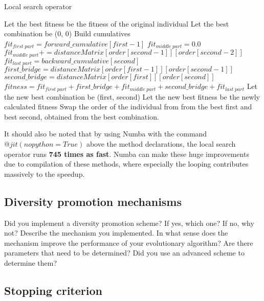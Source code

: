 \documentclass[a4paper,10pt]{article}
\newcommand{\ReplaceMe}[1]{{\color{blue}#1}}
\begin{document}
\begin{algorithm}
\caption{Local search operator}\label{local_search_operator_algorithm}
\begin{algorithmic}
\State Let the best fitness be the fitness of the original individual
\State Let the best combination be (0, 0)
\State Build cumulatives
\State $fit_{first \; part} = forward\_cumulative[first - 1]$
\State $fit_{middle \; part} = 0.0$
\State $fit_{middle \; part} \mathrel{{+}{=}} distanceMatrix[order[second-1]][order[second-2]]$
\State $fit_{last \; part} = backward\_cumulative[second]$
\State $first\_bridge = distanceMatrix[order[first-1]][order[second-1]]$
\State $second\_bridge = distanceMatrix[order[first]][order[second]]$
\State $fitness = fit_{first \; part} + first\_bridge + fit_{middle \; part} + second\_bridge + fit_{last \; part}$
\State Let the new best combination be (first, second)
\State Let the new best fitness be the newly calculated fitness
\EndIf
\EndFor
\EndFor
\State Swap the order of the individual from from the best first and best second, obtained from the best combination.
\end{algorithmic}
\end{algorithm}

It should also be noted that by using Numba with the command $@jit(nopython=True)$ above the method declarations, the local search operator runs \textbf{745 times as fast}. Numba can make these huge improvements due to compilation of these methods, where especially the looping contributes massively to the speedup.


\subsection{Diversity promotion mechanisms}
\label{diversity_promotion}
\ReplaceMe{Did you implement a diversity promotion scheme? If yes, which one? If no, why not? Describe the mechanism you implemented. In what sense does the mechanism improve the performance of your evolutionary algorithm? Are there parameters that need to be determined? Did you use an advanced scheme to determine them?}

\subsection{Stopping criterion}
\end{document}
